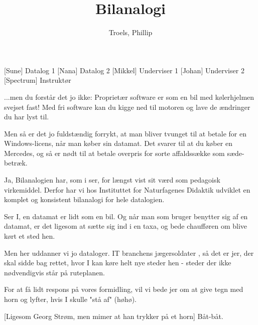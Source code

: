 \documentclass[a4paper,11pt]{article}
\title{Bilanalogi}
\author{Troels, Phillip}
\begin{document}
\maketitle
\begin{roles}
  [Sune] Datalog 1
  [Nana] Datalog 2
  [Mikkel] Underviser 1
  [Johan] Underviser 2
  [Spectrum] Instruktør
\end{roles}

\begin{sketch}

   ...men du forstår det jo ikke: Proprietær software er som
   en bil med kølerhjelmen svejset fast! Med fri software kan du kigge
   ned til motoren og lave de ændringer du har lyst til.

   Men så er det jo fuldstændig forrykt, at man bliver tvunget
  til at betale for en Windows-licens, når man køber sin datamat. Det
  svarer til at du køber en Mercedes, og så er nødt til at betale
  overpris for sorte affaldssække som sæde-betræk.



   Ja, Bilanalogien har, som i ser, for længst vist sit værd som pedagoisk
  virkemiddel. Derfor har vi hos Instituttet for Naturfagenes Didaktik
  udviklet en komplet og konsistent bilanalogi for hele datalogien.

   Ser I, en datamat er lidt som en bil. Og når man som
  bruger benytter sig af en datamat, er det ligesom at sætte sig ind i
  en taxa, og bede chaufføren om blive kørt et sted hen.

   Men her uddanner vi jo dataloger. IT branchens jægersoldater , så det er jer, der skal sidde
  bag rettet, hvor I kan køre helt nye steder hen - steder der ikke
  nødvendigvis står på ruteplanen.

   For at få lidt respons på vores formidling, vil vi bede
  jer om at give tegn med horn og lyfter, hvis I skulle "stå af"
  (høhø).

  [Ligesom Georg Strøm, men mimer at han trykker på et horn]
  Båt-båt.

% 


\end{sketch}
\end{document}
